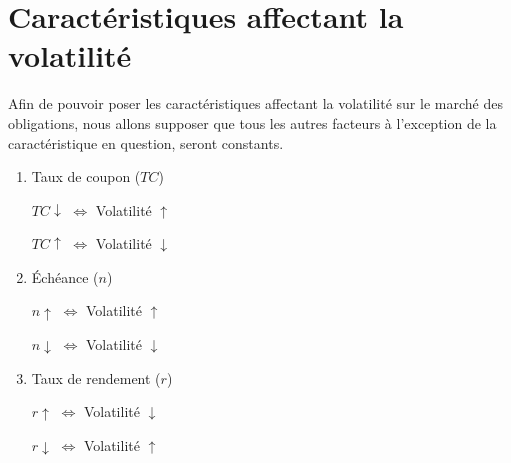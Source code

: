 \documentclass[12pt]{article}
\begin{document}
\section{Caractéristiques affectant la volatilité}
Afin de pouvoir poser les caractéristiques affectant la volatilité sur le marché des obligations, nous allons supposer que tous les autres facteurs à l'exception de la caractéristique en question, seront constants. 
\begin{enumerate}
\item Taux de coupon ($TC$)
\begin{center}
$TC \downarrow$ \hspace{1cm} $\Longleftrightarrow$  \hspace{1cm} Volatilité $\uparrow$
\end{center}
\begin{center}
$TC \uparrow$ \hspace{1cm} $\Longleftrightarrow$  \hspace{1cm} Volatilité $\downarrow$
\end{center}
\item Échéance ($n$)
\begin{center}
$n \uparrow$ \hspace{1cm} $\Longleftrightarrow$  \hspace{1cm} Volatilité $\uparrow$
\end{center}
\begin{center}
$n \downarrow$ \hspace{1cm} $\Longleftrightarrow$  \hspace{1cm} Volatilité $\downarrow$
\end{center}
\item Taux de rendement ($r$)
\begin{center}
$r \uparrow$ \hspace{1cm} $\Longleftrightarrow$  \hspace{1cm} Volatilité $\downarrow$
\end{center}
\begin{center}
$r \downarrow$ \hspace{1cm} $\Longleftrightarrow$  \hspace{1cm} Volatilité $\uparrow$
\end{center}
\end{enumerate}
\end{document}
